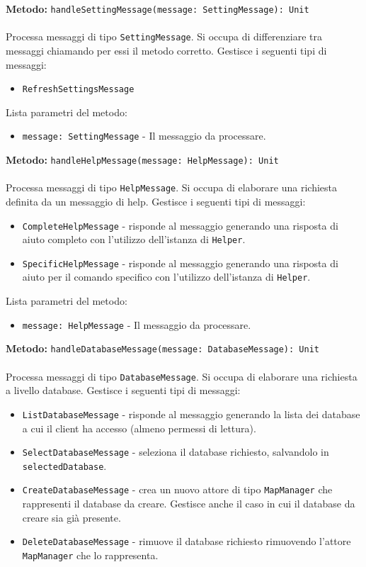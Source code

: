 \documentclass[a4paper]{article}
\begin{document}
		\textbf{Metodo: }\texttt{handleSettingMessage(message: SettingMessage): Unit}
			\\ \\
			Processa messaggi di tipo \texttt{SettingMessage}. Si occupa di differenziare tra messaggi chiamando per essi il metodo corretto.
			Gestisce i seguenti tipi di messaggi:
			\begin{itemize}
				\item \texttt{RefreshSettingsMessage}
			\end{itemize}
			Lista parametri del metodo:
			\begin{itemize}
				\item \texttt{message: SettingMessage} - Il messaggio da processare.
			\end{itemize}			
		\textbf{Metodo: }\texttt{handleHelpMessage(message: HelpMessage): Unit}
			\\ \\
			Processa messaggi di tipo \texttt{HelpMessage}. Si occupa di elaborare una richiesta definita da un messaggio di help.
			Gestisce i seguenti tipi di messaggi:
			\begin{itemize}
				\item \texttt{CompleteHelpMessage} - risponde al messaggio generando una risposta di aiuto completo con l'utilizzo dell'istanza di \texttt{Helper}.
				\item \texttt{SpecificHelpMessage} - risponde al messaggio generando una risposta di aiuto per il comando specifico con l'utilizzo dell'istanza di \texttt{Helper}.
			\end{itemize}
			Lista parametri del metodo:
			\begin{itemize}
				\item \texttt{message: HelpMessage} - Il messaggio da processare.
			\end{itemize}			
		\textbf{Metodo: }\texttt{handleDatabaseMessage(message: DatabaseMessage): Unit}
			\\ \\
			Processa messaggi di tipo \texttt{DatabaseMessage}. Si occupa di elaborare una richiesta a livello database.
			Gestisce i seguenti tipi di messaggi:
			\begin{itemize}
				\item \texttt{ListDatabaseMessage} - risponde al messaggio generando la lista dei database a cui il client ha accesso (almeno permessi di lettura).
				\item \texttt{SelectDatabaseMessage} - seleziona il database richiesto, salvandolo in \texttt{selectedDatabase}.
				\item \texttt{CreateDatabaseMessage} - crea un nuovo attore di tipo \texttt{MapManager} che rappresenti il database da creare. Gestisce anche il caso in cui il database da creare sia già presente.
				\item \texttt{DeleteDatabaseMessage} - rimuove il database richiesto rimuovendo l'attore \texttt{MapManager} che lo rappresenta.
			\end{itemize}
\end{document}
